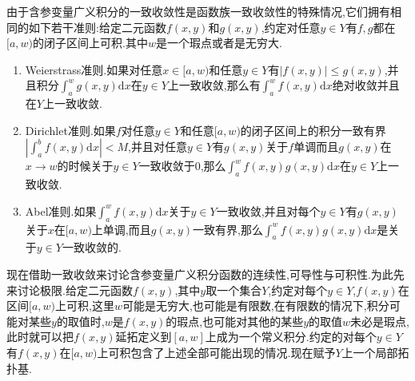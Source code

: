 由于含参变量广义积分的一致收敛性是函数族一致收敛性的特殊情况,它们拥有相同的如下若干准则:给定二元函数$f(x,y)$和$g(x,y)$,约定对任意$y\in Y$有$f,g$都在$[a,w)$的闭子区间上可积.其中$w$是一个瑕点或者是无穷大.
\begin{enumerate}
	\item Weierstrass准则.如果对任意$x\in[a,w)$和任意$y\in Y$有$|f(x,y)|\le g(x,y)$,并且积分$\int_a^wg(x,y)\mathrm{d}x$在$y\in Y$上一致收敛,那么有$\int_a^wf(x,y)\mathrm{d}x$绝对收敛并且在$Y$上一致收敛.
	\item Dirichlet准则.如果$f$对任意$y\in Y$和任意$[a,w)$的闭子区间上的积分一致有界$\left|\int_a^bf(x,y)\mathrm{d}x\right|<M$,并且对任意$y\in Y$有$g(x,y)$关于$f$单调而且$g(x,y)$在$x\to w$的时候关于$y\in Y$一致收敛于0,那么$\int_a^wf(x,y)g(x,y)\mathrm{d}x$在$y\in Y$上一致收敛.
	\item Abel准则.如果$\int_a^wf(x,y)\mathrm{d}x$关于$y\in Y$一致收敛,并且对每个$y\in Y$有$g(x,y)$关于$x$在$[a,w)$上单调,而且$g(x,y)$一致有界,那么$\int_a^wf(x,y)g(x,y)\mathrm{d}x$是关于$y\in Y$一致收敛的.
\end{enumerate}

现在借助一致收敛来讨论含参变量广义积分函数的连续性,可导性与可积性.为此先来讨论极限.给定二元函数$f(x,y)$,其中$y$取一个集合$Y$,约定对每个$y\in Y$,$f(x,y)$在区间$[a,w)$上可积,这里$w$可能是无穷大,也可能是有限数,在有限数的情况下,积分可能对某些$y$的取值时,$w$是$f(x,y)$的瑕点,也可能对其他的某些$y$的取值$w$未必是瑕点,此时就可以把$f(x,y)$延拓定义到$[a,w]$上成为一个常义积分.约定的对每个$y\in Y$有$f(x,y)$在$[a,w)$上可积包含了上述全部可能出现的情况.现在赋予$Y$上一个局部拓扑基.

